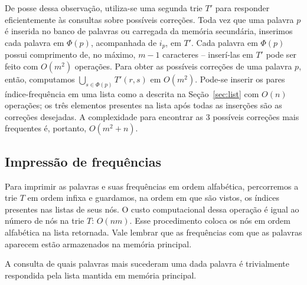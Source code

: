\documentclass[12pt]{article}
\begin{document}
    De posse dessa observação, utiliza-se uma segunda trie $T'$ para responder eficientemente às consultas sobre possíveis correções.
    Toda vez que uma palavra $p$ é inserida no banco de palavras ou carregada da memória secundária, inserimos cada palavra em $\Phi(p)$, acompanhada de $i_p$, em $T'$.
    Cada palavra em $\Phi(p)$ possui comprimento de, no máximo, $m - 1$ caracteres -- inserí-las em $T'$ pode ser feito com $O(m^2)$ operações.
    Para obter as possíveis correções de uma palavra $p$, então, computamos $\bigcup_{s \in \Phi(p)} T'(r, s)$ em $O(m^2)$.
    Pode-se inserir os pares índice-frequência em uma lista como a descrita na Seção~\ref{sec:list} com $O(n)$ operações; os três elementos presentes na lista após todas as inserções são as correções desejadas.
    A complexidade para encontrar as 3 possíveis correções mais frequentes é, portanto, $O(m^2 + n)$.

    \subsection{Impressão de frequências}
    Para imprimir as palavras e suas frequências em ordem alfabética, percorremos a trie $T$ em ordem infixa e guardamos, na ordem em que são vistos, os índices presentes nas listas de seus nós.
    O custo computacional dessa operação é igual ao número de nós na trie $T$: $O(nm)$.
    Esse procedimento coloca os nós em ordem alfabética na lista retornada. 
    Vale lembrar que as frequências com que as palavras aparecem estão armazenados na memória principal.

    A consulta de quais palavras mais sucederam uma dada palavra é trivialmente respondida pela lista mantida em memória principal.
\end{document}
